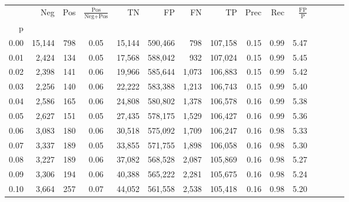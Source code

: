 \begin{tabular}{rrrcrrrrrrrrrrr}
\toprule
{} &     Neg &    Pos & $\frac{\text{Pos}}{\text{Neg}+\text{Pos}}$ &       TN &       FP &       FN &       TP &  Prec &   Rec & $\frac{\text{FP}}{\text{P}}$ \\
p    &         &        &                                            &          &          &          &          &       &       &                              \\
\midrule
0.00 &  15,144 &    798 &                                       0.05 &   15,144 &  590,466 &      798 &  107,158 &  0.15 &  0.99 &                         5.47 \\
0.01 &   2,424 &    134 &                                       0.05 &   17,568 &  588,042 &      932 &  107,024 &  0.15 &  0.99 &                         5.45 \\
0.02 &   2,398 &    141 &                                       0.06 &   19,966 &  585,644 &    1,073 &  106,883 &  0.15 &  0.99 &                         5.42 \\
0.03 &   2,256 &    140 &                                       0.06 &   22,222 &  583,388 &    1,213 &  106,743 &  0.15 &  0.99 &                         5.40 \\
0.04 &   2,586 &    165 &                                       0.06 &   24,808 &  580,802 &    1,378 &  106,578 &  0.16 &  0.99 &                         5.38 \\
0.05 &   2,627 &    151 &                                       0.05 &   27,435 &  578,175 &    1,529 &  106,427 &  0.16 &  0.99 &                         5.36 \\
0.06 &   3,083 &    180 &                                       0.06 &   30,518 &  575,092 &    1,709 &  106,247 &  0.16 &  0.98 &                         5.33 \\
0.07 &   3,337 &    189 &                                       0.05 &   33,855 &  571,755 &    1,898 &  106,058 &  0.16 &  0.98 &                         5.30 \\
0.08 &   3,227 &    189 &                                       0.06 &   37,082 &  568,528 &    2,087 &  105,869 &  0.16 &  0.98 &                         5.27 \\
0.09 &   3,306 &    194 &                                       0.06 &   40,388 &  565,222 &    2,281 &  105,675 &  0.16 &  0.98 &                         5.24 \\
0.10 &   3,664 &    257 &                                       0.07 &   44,052 &  561,558 &    2,538 &  105,418 &  0.16 &  0.98 &                         5.20 \\

\end{tabular}
